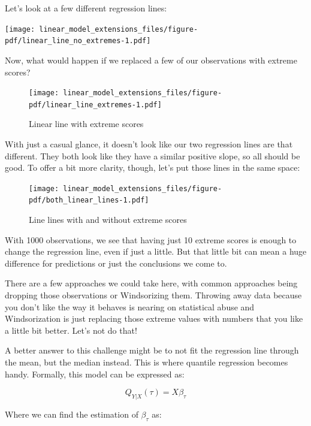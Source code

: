 \documentclass[
  letterpaper,
]{krantz}
\begin{document}
Let's look at a few different regression lines:

\texttt{[image: linear\_model\_extensions\_files/figure-pdf/linear\_line\_no\_extremes-1.pdf]}

Now, what would happen if we replaced a few of our observations with
extreme scores?

\begin{figure}

{\centering \texttt{[image: linear\_model\_extensions\_files/figure-pdf/linear\_line\_extremes-1.pdf]}

}

\caption{Linear line with extreme scores}

\end{figure}

With just a casual glance, it doesn't look like our two regression lines
are that different. They both look like they have a similar positive
slope, so all should be good. To offer a bit more clarity, though, let's
put those lines in the same space:

\begin{figure}

{\centering \texttt{[image: linear\_model\_extensions\_files/figure-pdf/both\_linear\_lines-1.pdf]}

}

\caption{Line lines with and without extreme scores}

\end{figure}

With 1000 observations, we see that having just 10 extreme scores is
enough to change the regression line, even if just a little. But that
little bit can mean a huge difference for predictions or just the
conclusions we come to.

There are a few approaches we could take here, with common approaches
being dropping those observations or Windsorizing them. Throwing away
data because you don't like the way it behaves is nearing on statistical
abuse and Windsorization is just replacing those extreme values with
numbers that you like a little bit better. Let's not do that!

A better answer to this challenge might be to not fit the regression
line through the mean, but the median instead. This is where quantile
regression becomes handy. Formally, this model can be expressed as:

\[
Q_{Y\vert X}(\tau) = X\beta_\tau
\]

Where we can find the estimation of \(\beta_\tau\) as:
\end{document}
